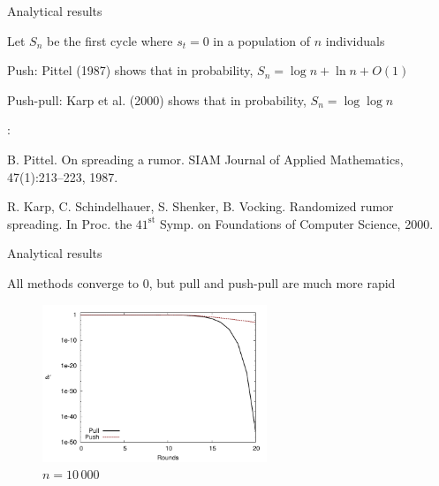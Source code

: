 \begin{frame}{Analytical results}

\begin{definition}
Let $S_n$ be the first cycle where $s_t=0$ in a population of $n$ individuals 
\BI
\item \alert{Push}: Pittel (1987) shows that in probability, $S_n = \log n + \ln n + O(1)$
\item \alert{Push-pull}: Karp et al. (2000) shows that in probability, $S_n = \log \log n$
\EI
\end{definition}

\bigskip
{\footnotesize
{}:
\BI
\item B. Pittel. \alert{On spreading a rumor}. SIAM Journal of Applied Mathematics, 47(1):213–223, 1987.
\item R. Karp, C. Schindelhauer, S. Shenker, B. Vocking. \alert{Randomized
rumor spreading}. In Proc. the $41^{\textrm{st}}$ Symp. on
Foundations of Computer Science, 2000.
\EI
}



\end{frame}


\begin{frame}{Analytical results}


All methods converge to $0$, but pull and push-pull are much more rapid

\begin{figure}
\includegraphics[width=0.6\textwidth]{figs/05/gnuplot}
\caption{$n=10\,000$}
\end{figure}

\end{frame}

